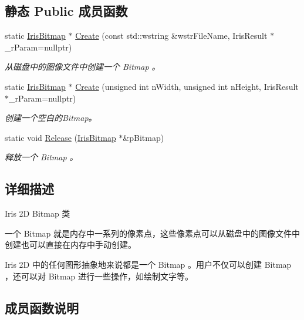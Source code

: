 \subsection*{静态 Public 成员函数}
\begin{DoxyCompactItemize}
\item 
static \hyperlink{class_iris2_d_1_1_iris_bitmap}{Iris\+Bitmap} $\ast$ \hyperlink{class_iris2_d_1_1_iris_bitmap_ac9d31fd83b64c4051e1474eb7322442f}{Create} (const std\+::wstring \&wstr\+File\+Name, Iris\+Result $\ast$\+\_\+r\+Param=nullptr)
\begin{DoxyCompactList}\small\item\em 从磁盘中的图像文件中创建一个 Bitmap 。 \end{DoxyCompactList}\item 
static \hyperlink{class_iris2_d_1_1_iris_bitmap}{Iris\+Bitmap} $\ast$ \hyperlink{class_iris2_d_1_1_iris_bitmap_a42a6c58440df5bb965a2d299cd3620e4}{Create} (unsigned int n\+Width, unsigned int n\+Height, Iris\+Result $\ast$\+\_\+r\+Param=nullptr)
\begin{DoxyCompactList}\small\item\em 创建一个空白的\+Bitmap。 \end{DoxyCompactList}\item 
static void \hyperlink{class_iris2_d_1_1_iris_bitmap_a30f09c40ae048de40f06c0a1d6575441}{Release} (\hyperlink{class_iris2_d_1_1_iris_bitmap}{Iris\+Bitmap} $\ast$\&p\+Bitmap)
\begin{DoxyCompactList}\small\item\em 释放一个 Bitmap 。 \end{DoxyCompactList}\end{DoxyCompactItemize}


\subsection{详细描述}
Iris 2D Bitmap 类 

一个 Bitmap 就是内存中一系列的像素点，这些像素点可以从磁盘中的图像文件中创建也可以直接在内存中手动创建。

Iris 2D 中的任何图形抽象地来说都是一个 Bitmap 。用户不仅可以创建 Bitmap ，还可以对 Bitmap 进行一些操作，如绘制文字等。 

\subsection{成员函数说明}
\mbox{\label{class_iris2_d_1_1_iris_bitmap_ac9d31fd83b64c4051e1474eb7322442f}} 
